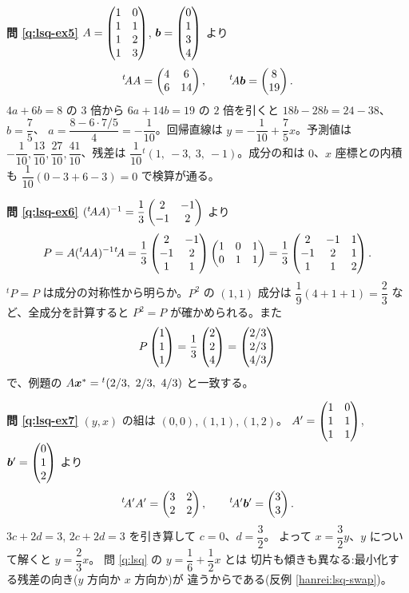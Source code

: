 \bigskip
\noindent\textbf{問 \ref{q:lsq-ex5}}\quad
$A = \begin{pmatrix}1 & 0 \\ 1 & 1 \\ 1 & 2 \\ 1 & 3\end{pmatrix}$,
$\bm{b} = \begin{pmatrix}0 \\ 1 \\ 3 \\ 4\end{pmatrix}$ より
\[
{}^t\!AA = \begin{pmatrix}4 & 6 \\ 6 & 14\end{pmatrix}, \qquad {}^t\!A\bm{b} = \begin{pmatrix}8 \\ 19\end{pmatrix}.
\]
$4a + 6b = 8$ の $3$ 倍から $6a + 14b = 19$ の $2$ 倍を引くと
$18b - 28b = 24 - 38$、$b = \dfrac{7}{5}$、
$a = \dfrac{8 - 6 \cdot 7/5}{4} = -\dfrac{1}{10}$。回帰直線は
$y = -\dfrac{1}{10} + \dfrac{7}{5}x$。予測値は
$-\dfrac{1}{10}, \dfrac{13}{10}, \dfrac{27}{10}, \dfrac{41}{10}$、残差は
$\dfrac{1}{10}{}^t(1,\ -3,\ 3,\ -1)$。成分の和は $0$、$x$ 座標との内積も
$\dfrac{1}{10}(0 - 3 + 6 - 3) = 0$ で検算が通る。

\bigskip
\noindent\textbf{問 \ref{q:lsq-ex6}}\quad
$({}^t\!AA)^{-1} = \dfrac{1}{3}\begin{pmatrix}2 & -1 \\ -1 & 2\end{pmatrix}$ より
\[
P = A({}^t\!AA)^{-1}{}^t\!A
= \frac{1}{3}\begin{pmatrix}2 & -1 \\ -1 & 2 \\ 1 & 1\end{pmatrix}\begin{pmatrix}1 & 0 & 1 \\ 0 & 1 & 1\end{pmatrix}
= \frac{1}{3}\begin{pmatrix}2 & -1 & 1 \\ -1 & 2 & 1 \\ 1 & 1 & 2\end{pmatrix}.
\]
${}^t\!P = P$ は成分の対称性から明らか。$P^2$ の $(1,1)$ 成分は
$\dfrac{1}{9}(4 + 1 + 1) = \dfrac{2}{3}$ など、全成分を計算すると
$P^2 = P$ が確かめられる。また
\[
P\begin{pmatrix}1 \\ 1 \\ 1\end{pmatrix} = \frac{1}{3}\begin{pmatrix}2 \\ 2 \\ 4\end{pmatrix} = \begin{pmatrix}2/3 \\ 2/3 \\ 4/3\end{pmatrix}
\]
で、例題の $A\vect{x}^* = {}^t(2/3,\ 2/3,\ 4/3)$ と一致する。

\bigskip
\noindent\textbf{問 \ref{q:lsq-ex7}}\quad
$(y, x)$ の組は $(0, 0), (1, 1), (1, 2)$。
$A' = \begin{pmatrix}1 & 0 \\ 1 & 1 \\ 1 & 1\end{pmatrix}$, $\bm{b}' = \begin{pmatrix}0 \\ 1 \\ 2\end{pmatrix}$ より
\[
{}^t\!A'A' = \begin{pmatrix}3 & 2 \\ 2 & 2\end{pmatrix}, \qquad {}^t\!A'\bm{b}' = \begin{pmatrix}3 \\ 3\end{pmatrix}.
\]
$3c + 2d = 3$, $2c + 2d = 3$ を引き算して $c = 0$、$d = \dfrac{3}{2}$。
よって $x = \dfrac{3}{2}y$、$y$ について解くと $y = \dfrac{2}{3}x$。
問 \ref{q:lsq} の $y = \dfrac{1}{6} + \dfrac{1}{2}x$ とは
切片も傾きも異なる:最小化する残差の向き($y$ 方向か $x$ 方向か)が
違うからである(反例 \ref{hanrei:lsq-swap})。

